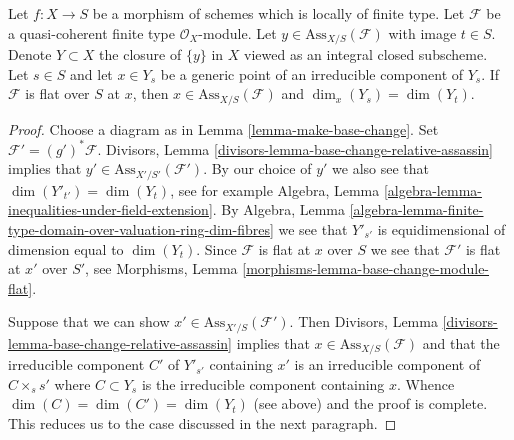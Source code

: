 \begin{lemma}
\label{lemma-associated-point-specializes}
Let $f : X \to S$ be a morphism of schemes which is locally of finite type.
Let $\mathcal{F}$ be a quasi-coherent finite type $\mathcal{O}_X$-module.
Let $y \in \text{Ass}_{X/S}(\mathcal{F})$ with image $t \in S$.
Denote $Y \subset X$ the closure of $\{y\}$ in $X$ viewed
as an integral closed subscheme. Let $s \in S$
and let $x \in Y_s$ be a generic point of an irreducible component
of $Y_s$. If $\mathcal{F}$ is flat over $S$ at $x$, then
$x \in \text{Ass}_{X/S}(\mathcal{F})$ and
$\dim_x(Y_s) = \dim(Y_t)$.
\end{lemma}

\begin{proof}
Choose a diagram as in Lemma \ref{lemma-make-base-change}.
Set $\mathcal{F}' = (g')^*\mathcal{F}$.
Divisors, Lemma \ref{divisors-lemma-base-change-relative-assassin}
implies that $y' \in \text{Ass}_{X'/S'}(\mathcal{F}')$.
By our choice of $y'$ we also see that $\dim(Y'_{t'}) = \dim(Y_t)$,
see for example Algebra, Lemma
\ref{algebra-lemma-inequalities-under-field-extension}.
By Algebra, Lemma
\ref{algebra-lemma-finite-type-domain-over-valuation-ring-dim-fibres}
we see that $Y'_{s'}$ is equidimensional of dimension equal to $\dim(Y_t)$.
Since $\mathcal{F}$ is flat at $x$ over $S$ we see that
$\mathcal{F}'$ is flat at $x'$ over $S'$, see
Morphisms, Lemma \ref{morphisms-lemma-base-change-module-flat}.

\medskip\noindent
Suppose that we can show $x' \in \text{Ass}_{X'/S}(\mathcal{F}')$. Then
Divisors, Lemma \ref{divisors-lemma-base-change-relative-assassin}
implies that $x \in \text{Ass}_{X/S}(\mathcal{F})$ and that
the irreducible component $C'$ of $Y'_{s'}$ containing $x'$
is an irreducible component of $C \times_s s'$ where $C \subset Y_s$
is the irreducible component containing $x$.
Whence $\dim(C) = \dim(C') = \dim(Y_t)$ (see above) and the
proof is complete.
This reduces us to the case discussed in the next paragraph.


\end{proof}
